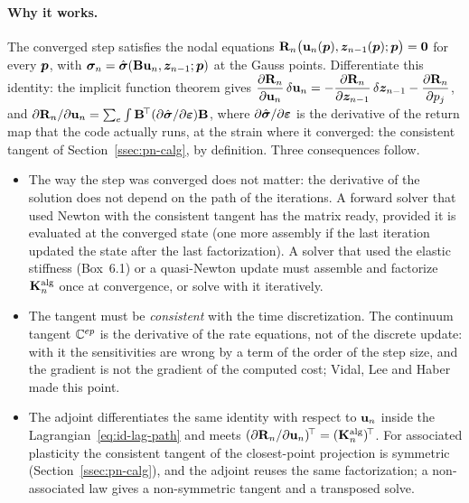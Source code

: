 \paragraph{Why it works.} The converged step satisfies the nodal equations
$\mathbf{R}_n\bigl(\mathbf{u}_n(\bm{p}),\bm{z}_{n-1}(\bm{p});\bm{p}\bigr)=\mathbf{0}$ for every $\bm{p}$, with
$\bm{\sigma}_n=\hat{\bm{\sigma}}(\mathbf{B}\mathbf{u}_n,\bm{z}_{n-1};\bm{p})$ at the Gauss points. Differentiate
this identity: the implicit function theorem gives
$\dfrac{\partial\mathbf{R}_n}{\partial\mathbf{u}_n}\,\delta\mathbf{u}_n
=-\dfrac{\partial\mathbf{R}_n}{\partial\bm{z}_{n-1}}\,\delta\bm{z}_{n-1}-\dfrac{\partial\mathbf{R}_n}{\partial p_j}$,
and $\partial\mathbf{R}_n/\partial\mathbf{u}_n=\sum_e\int\mathbf{B}^{\!\top}(\partial\hat{\bm{\sigma}}/\partial\bm{\varepsilon})\mathbf{B}$,
where $\partial\hat{\bm{\sigma}}/\partial\bm{\varepsilon}$ is the derivative of the return map that the
code actually runs, at the strain where it converged: the consistent tangent of
Section~\ref{ssec:pn-calg}, by definition. Three consequences follow.
\begin{itemize}
  \item The way the step was converged does not matter: the derivative of the
  solution does not depend on the path of the iterations. A forward solver that
  used Newton with the consistent tangent has the matrix ready, provided it is
  evaluated at the converged state (one more assembly if the last iteration
  updated the state after the last factorization). A solver that used the elastic
  stiffness (Box~6.1) or a quasi-Newton update must assemble and factorize
  $\mathbf{K}^{\mathrm{alg}}_n$ once at convergence, or solve with it iteratively.
  \item The tangent must be \emph{consistent} with the time discretization. The
  continuum tangent $\mathbb{C}^{ep}$ is the derivative of the rate equations, not of the
  discrete update: with it the sensitivities are wrong by a term of the order of
  the step size, and the gradient is not the gradient of the computed cost; Vidal,
  Lee and Haber~\cite{VidalLeeHaber1991} made this point.
  \item The adjoint differentiates the same identity with respect to $\mathbf{u}_n$
  inside the Lagrangian~\eqref{eq:id-lag-path} and meets
  $(\partial\mathbf{R}_n/\partial\mathbf{u}_n)^{\!\top}=(\mathbf{K}^{\mathrm{alg}}_n)^{\!\top}$. For associated
  plasticity the consistent tangent of the closest-point projection is symmetric
  (Section~\ref{ssec:pn-calg}), and the adjoint reuses the same factorization; a
  non-associated law gives a non-symmetric tangent and a transposed solve.
\end{itemize}

